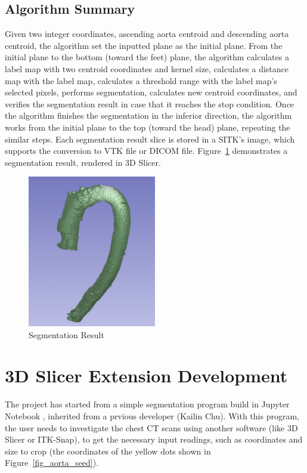 \subsection{Algorithm Summary}
Given two integer coordinates, ascending aorta centroid and descending aorta centroid, the algorithm set the inputted plane as the initial plane. From the initial plane to the bottom (toward the feet) plane, the algorithm calculates a label map with two centroid coordinates and kernel size, calculates a distance map with the label map, calculates a threshold range with the label map's selected pixels, performs segmentation, calculates new centroid coordinates, and verifies the segmentation result in case that it reaches the stop condition. Once the algorithm finishes the segmentation in the inferior direction, the algorithm works from the initial plane to the top (toward the head) plane, repeating the similar steps. Each segmentation result slice is stored in a SITK's image, which supports the conversion to VTK file or DICOM file. Figure~\ref{fig_sr} demonstrates a segmentation result, rendered in 3D Slicer.

\begin{figure}[H]
    \centering
    \includegraphics[width=0.5\textwidth]{figures/AGR/segmentation_result.jpg}
    \caption[Segmentation Result]{Segmentation Result}
    \label{fig_sr}
\end{figure}

\section{3D Slicer Extension Development}
The project has started from a simple segmentation program build in Jupyter Notebook \cite{Kluyver2016jupyter}, inherited from a prvious developer (Kailin Chu). With this program, the user needs to investigate the chest CT scans using another software (like 3D Slicer or ITK-Snap), to get the necessary input readings, such as coordinates and size to crop (the coordinates of the yellow dots shown in Figure~\ref{fig_aorta_seed}).

